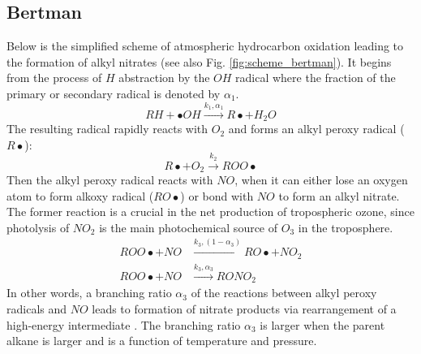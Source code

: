 \documentclass[11pt,a4paper]{article}
\begin{document}
\subsection{Bertman}
Below is the simplified scheme of atmospheric hydrocarbon oxidation leading to the formation of alkyl nitrates (see also Fig. \ref{fig:scheme_bertman}). It begins from the process of $H$ abstraction by the $OH$ radical where the fraction of the primary or secondary radical is denoted by $\alpha_1$.
\begin{equation} \label{eq:alkane_oh}
RH + \bullet OH \xrightarrow{k_1, \alpha_1} R\bullet + H_2O
\end{equation}
The resulting radical rapidly reacts with $O_2$ and forms an alkyl peroxy radical ($R\bullet$):
\begin{equation} \label{eq:rad_o2}
R\bullet + O_2 \xrightarrow{k_2} ROO\bullet
\end{equation}
Then the alkyl peroxy radical reacts with $NO$, when it can either lose an oxygen atom to form alkoxy radical ($RO\bullet$) or bond with $NO$ to form an alkyl nitrate. The former reaction is a crucial in the net production of tropospheric ozone, since photolysis of $NO_2$ is the main photochemical source of $O_3$ in the troposphere.
\begin{subequations} \label{eq:peroxy_no0}
\begin{align}
ROO\bullet + NO &\xrightarrow{k_3, (1-\alpha_3)} RO\bullet + NO_2 \label{eq:peroxy_no1}\\
ROO\bullet + NO &\xrightarrow{k_3, \alpha_3} RONO_2 \label{eq:peroxy_no2}
\end{align}
\end{subequations}
In other words, a branching ratio $\alpha_3$ of the reactions between alkyl peroxy radicals and $NO$ leads to formation of nitrate products via rearrangement of a high-energy intermediate \citep{Bertman1995}. The branching ratio $\alpha_3$ is larger when the parent alkane is larger and is a function of temperature and pressure.
\end{document}
